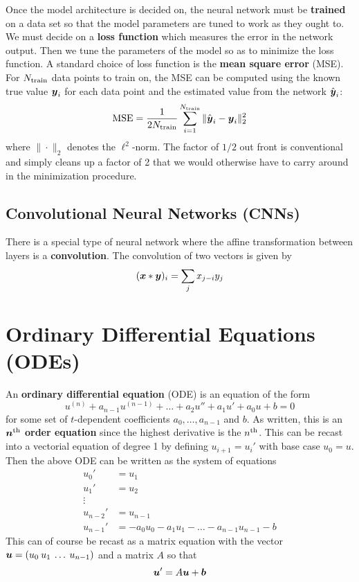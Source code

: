 \documentclass[onecolumn]{gwclass}
\begin{document}
Once the model architecture is decided on, the neural network must be \textbf{trained} on a data set so that the model parameters are tuned to work as they ought to. We must decide on a \textbf{loss function} which measures the error in the network output. Then we tune the parameters of the model so as to minimize the loss function. A standard choice of loss function is the \textbf{mean square error} (MSE). For $N_{\text{\normalfont{train}}}$ data points to train on, the MSE can be computed using the known true value $\boldsymbol{y}_i$ for each data point and the estimated value from the network $\hat{\boldsymbol{y}}_i$:
$$ \text{\normalfont{MSE}} = \frac{1}{2N_{\text{\normalfont{train}}}}\sum_{i=1}^{N_{\text{\normalfont{train}}}}\|\hat{\boldsymbol{y}}_i - \boldsymbol{y}_i\|_2^2 $$
where $\|\cdot\|_2$ denotes the $\ell^2$-norm. The factor of $1/2$ out front is conventional and simply cleans up a factor of 2 that we would otherwise have to carry around in the minimization procedure.

\subsection{Convolutional Neural Networks (CNNs)}
There is a special type of neural network where the affine transformation between layers is a \textbf{convolution}. The convolution of two vectors is given by
$$ (\boldsymbol{x} * \boldsymbol{y})_i = \sum_jx_{j-i}y_j $$




\newpage
\section{Ordinary Differential Equations (ODEs)}
An \textbf{ordinary differential equation} (ODE) is an equation of the form
$$ u^{(n)} + a_{n-1}u^{(n-1)} + \dots + a_2u'' + a_1u' + a_0u + b = 0 $$
for some set of $t$-dependent coefficients $a_0,\dots,a_{n-1}$ and $b$. As written, this is an \textbf{$\boldsymbol{n}^{\text{\normalfont{th}}}$ order equation} since the highest derivative is the $n^{\text{\normalfont{th}}}$. This can be recast into a vectorial equation of degree 1 by defining $u_{i+1} = u_i'$ with base case $u_0=u$. Then the above ODE can be written as the system of equations
\begin{align*}
	u_0' &= u_1 \\
	u_1' &= u_2 \\
	\vdots &\\
	u_{n-2}' &= u_{n-1}\\
	u_{n-1}' &= -a_0u_0 - a_1u_1 -\dots -a_{n-1}u_{n-1} - b
\end{align*}
This can of course be recast as a matrix equation with the vector $\boldsymbol{u}=(u_0\:u_1\:\dots\:u_{n-1})$ and a matrix $A$ so that
$$ \boldsymbol{u}' = A\boldsymbol{u} + \boldsymbol{b} $$
\end{document}
